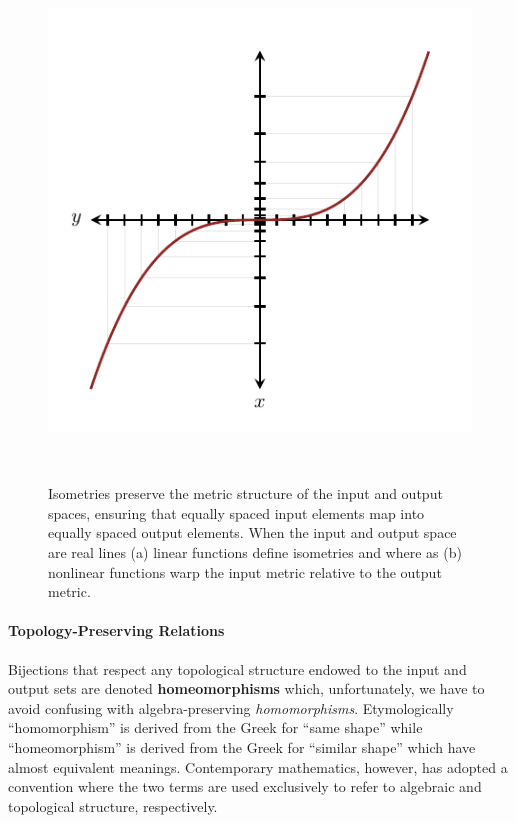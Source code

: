 \documentclass[
  letterpaper,
  DIV=11,
  numbers=noendperiod]{scrartcl}
\let\oldparagraph\paragraph
\renewcommand{\paragraph}[1]{\oldparagraph{#1}\mbox{}}
\begin{document}
\begin{figure}
\begin{minipage}[t]{0.45\linewidth}
{{\includegraphics{figures/maps/metric_pushforward/metric_pushforward.pdf}

}

}

\subcaption{\label{fig-non-isometric}}
\end{minipage}%
%
\begin{minipage}[t]{0.05\linewidth}

{\centering 

~

}

\end{minipage}%

\caption{\label{fig-isometry}Isometries preserve the metric structure of
the input and output spaces, ensuring that equally spaced input elements
map into equally spaced output elements. When the input and output space
are real lines (a) linear functions define isometries and where as (b)
nonlinear functions warp the input metric relative to the output
metric.}

\end{figure}

\hypertarget{topology-preserving-relations}{%
\paragraph{Topology-Preserving
Relations}\label{topology-preserving-relations}}

Bijections that respect any topological structure endowed to the input
and output sets are denoted \textbf{homeomorphisms} which,
unfortunately, we have to avoid confusing with algebra-preserving
\emph{homomorphisms}. Etymologically ``homomorphism'' is derived from
the Greek for ``same shape'' while ``homeomorphism'' is derived from the
Greek for ``similar shape'' which have almost equivalent meanings.
Contemporary mathematics, however, has adopted a convention where the
two terms are used exclusively to refer to algebraic and topological
structure, respectively.
\end{document}
